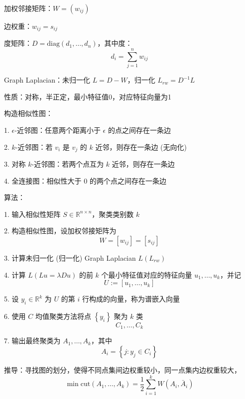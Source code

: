 \documentclass[openany]{ctexbook}
\theoremstyle{kaiti}
\theoremstyle{normal}
\begin{document}
加权邻接矩阵：$W=\left(w_{ij} \right)$

边权重：$w_{ij}=s_{ij}$

度矩阵：$D=\mathrm{diag}\left(d_1,\dots ,d_n \right)$，其中度：
\begin{equation}
d_i=\sum_{j=1}^{n}w_{ij}
\end{equation}

Graph Laplacian：未归一化 $L=D-W$，归一化 $L_{rw}=D^{-1}L$

性质：对称，半正定，最小特征值0，对应特征向量为1

构造相似性图：

1. $\epsilon$-近邻图：任意两个距离小于 $\epsilon$ 的点之间存在一条边

2. $k$-近邻图：若 $v_i$ 是 $v_j$ 的 $k$ 近邻，则存在一条边 (无向化) 

3. 对称 $k$-近邻图：若两个点互为 $k$ 近邻，则存在一条边

4. 全连接图：相似性大于 0 的两个点之间存在一条边

算法：

1. 输入相似性矩阵 $S\in \mathbb{R} ^{n\times n}$，聚类类别数 $k$

2. 构造相似性图，设加权邻接矩阵为 
\begin{equation}
  W=[w_{ij}]=[s_{ij}]
\end{equation}

3. 计算未归一化 (归一化) Graph Laplacian $L\left(L_{rw} \right)$

4. 计算 $L\left(Lu=\lambda Du \right)$ 的前 $k$ 个最小特征值对应的特征向量 $u_1,\dots ,u_k$，并记 
\begin{equation}
  U:=\left[u_1,\dots ,u_k \right]
\end{equation}

5. 设 $y_i\in \mathbb{R} ^k$ 为 $U$ 的第 $i$ 行构成的向量，称为谱嵌入向量

6. 使用 $C$ 均值聚类方法将点 $\left\{ y_i \right\}$ 聚为 $k$ 类 
  \begin{equation}
C_1,\dots ,C_k
\end{equation}

7. 输出最终聚类为 $A_1,\dots ,A_k$，其中 
\begin{equation}
  A_i=\left\{ j:y_j\in C_i \right\}
\end{equation}

推导：寻找图的划分，使得不同点集间边权重较小，同一点集内边权重较大，
\begin{equation}
\min \mathrm{cut}\left(A_1,\dots ,A_k \right)
=\frac{1}{2}\sum_{i=1}^{k}W\left(A_i,\bar{A}_i \right)
\end{equation}
\end{document}
